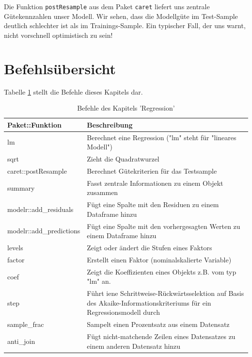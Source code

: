 \documentclass[12pt,ngerman,]{book}
\begin{document}
Die Funktion \texttt{postResample} aus dem Paket \texttt{caret} liefert
uns zentrale Gütekennzahlen unser Modell. Wir sehen, dass die Modellgüte
im Test-Sample deutlich schlechter ist als im Trainings-Sample. Ein
typischer Fall, der uns warnt, nicht vorschnell optimistisch zu sein!

\section{Befehlsübersicht}\label{befehlsubersicht-7}

Tabelle \ref{tab:befehle-regression} stellt die Befehle dieses Kapitels
dar.

\begin{table}

\caption{\label{tab:befehle-regression}Befehle des Kapitels 'Regression'}
\centering
\begin{tabular}[t]{l|l}
\hline
Paket::Funktion & Beschreibung\\
\hline
lm & Berechnet eine Regression ("lm" steht für "lineares Modell")\\
\hline
sqrt & Zieht die Quadratwurzel\\
\hline
caret::postResample & Berechnet Gütekriterien für das Testsample\\
\hline
summary & Fasst zentrale Informationen zu einem Objekt zusammen\\
\hline
modelr::add\_residuals & Fügt eine Spalte mit den Residuen zu einem Dataframe hinzu\\
\hline
modelr::add\_predictions & Fügt eine Spalte mit den vorhergesagten Werten zu einem Dataframe hinzu\\
\hline
levels & Zeigt oder ändert die Stufen eines Faktors\\
\hline
factor & Erstellt einen Faktor (nominalskalierte Variable)\\
\hline
coef & Zeigt die Koeffizienten eines Objekts z.B. vom typ "lm" an.\\
\hline
step & Führt iene Schrittweise-Rückwärtsselektion auf Basis des Akaike-Informationskriteriums für ein Regressionsmodell durch\\
\hline
sample\_frac & Sampelt einen Prozentsatz aus einem Datensatz\\
\hline
anti\_join & Fügt nicht-matchende Zeilen eines Datensatzes zu einem anderen Datensatz hinzu\\
\hline
\end{tabular}
\end{table}
\end{document}
